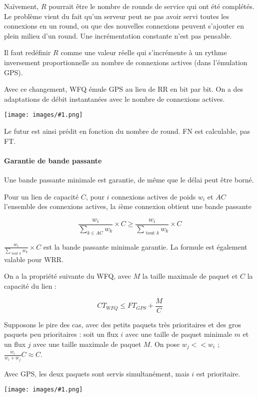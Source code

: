 \documentclass[10pt,a4paper]{report}
\newcommand{\dessin}[1]{\begin{center}\texttt{[image: images/\#1.png]}\end{center}}
\newcommand{\dessinS}[2]{\begin{center}\texttt{[image: images/\#1.png]}\end{center}}
\begin{document}
			Naïvement, $R$ pourrait être le nombre de rounds de service qui ont été complétés. Le problème vient du fait qu'un serveur peut ne pas avoir servi toutes les connexions en un round, ou que des nouvelles connexions peuvent s'ajouter en plein milieu d'un round. Une incrémentation constante n'est pas pensable.
			
			Il faut redéfinir $R$ comme une valeur réelle qui s'incrémente à un rythme inversement proportionnelle au nombre de connexions actives (dans l'émulation GPS).
			
			Avec ce changement, WFQ émule GPS au lieu de RR en bit par bit. On a des adaptations de débit instantanées avec le nombre de connexions actives.
			
			\dessin{99}
						
			Le futur est ainsi prédit en fonction du nombre de round. FN est calculable, pas FT.
			
			
			\paragraph{Garantie de bande passante}
			
			Une bande passante minimale est garantie, de même que le délai peut être borné.
			
			Pour un lien de capacité $C$, pour $i$ connexions actives de poids $w_i$ et $AC$ l'ensemble des connexions actives, la $i$ème connexion obtient une bande passante
			
			$$\frac{w_i}{\sum_{k \in AC} w_k} \times C \geq \frac{w_i}{\sum_{\text{ tout } k}w_k} \times C$$
			
			$\frac{w_i}{\sum_{\text{ tout } k}w_k} \times C$ est la bande passante minimale garantie. La formule est également valable pour WRR.
			
			On a la propriété suivante du WFQ, avec $M$ la taille maximale de paquet et $C$ la capacité du lien :
			
			$$CT_{WFQ} \leq FT_{GPS} + \frac{M}{C}$$
			
			Supposons le pire des cas, avec des petits paquets très prioritaires et des gros paquets peu prioritaires : soit un flux $i$ avec une taille de paquet minimale $m$ et un flux $j$ avec une taille maximale de paquet $M$. On pose $w_j << w_i$ ; $\frac{w_i}{w_i + w_j} C \approx C$. 
			
			Avec GPS, les deux paquets sont servis simultanément, mais $i$ est prioritaire.
						
			\dessinS{100}{.65}
			
\end{document}
